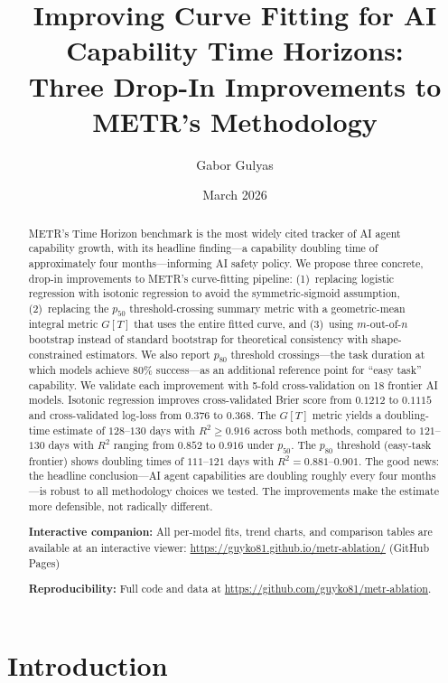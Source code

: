 \documentclass[11pt,a4paper]{article}
\title{Improving Curve Fitting for AI Capability Time Horizons:\\
       Three Drop-In Improvements to METR's Methodology}
\author{Gabor Gulyas}
\date{March 2026}
\begin{document}
\maketitle

\begin{abstract}
METR's Time Horizon benchmark is the most widely cited tracker of AI agent capability growth, with its headline finding---a capability doubling time of approximately four months---informing AI safety policy.
We propose three concrete, drop-in improvements to METR's curve-fitting pipeline: (1)~replacing logistic regression with isotonic regression to avoid the symmetric-sigmoid assumption, (2)~replacing the $p_{50}$ threshold-crossing summary metric with a geometric-mean integral metric $G[T]$ that uses the entire fitted curve, and (3)~using $m$-out-of-$n$ bootstrap instead of standard bootstrap for theoretical consistency with shape-constrained estimators.
We also report $p_{80}$ threshold crossings---the task duration at which models achieve 80\% success---as an additional reference point for ``easy task'' capability.
We validate each improvement with 5-fold cross-validation on 18 frontier AI models.
Isotonic regression improves cross-validated Brier score from $0.1212$ to $0.1115$ and cross-validated log-loss from $0.376$ to $0.368$.
The $G[T]$ metric yields a doubling-time estimate of $128$--$130$ days with $R^2 \geq 0.916$ across both methods, compared to $121$--$130$ days with $R^2$ ranging from $0.852$ to $0.916$ under $p_{50}$.
The $p_{80}$ threshold (easy-task frontier) shows doubling times of $111$--$121$ days with $R^2 = 0.881$--$0.901$.
The good news: the headline conclusion---AI agent capabilities are doubling roughly every four months---is robust to all methodology choices we tested.
The improvements make the estimate more defensible, not radically different.

\medskip\noindent
\textbf{Interactive companion:} All per-model fits, trend charts, and comparison tables are available at an interactive viewer:
\url{https://guyko81.github.io/metr-ablation/} \hfill {\small(GitHub Pages)}

\medskip\noindent
\textbf{Reproducibility:} Full code and data at \url{https://github.com/guyko81/metr-ablation}.
\end{abstract}

\section{Introduction}
\label{sec:intro}
\end{document}
